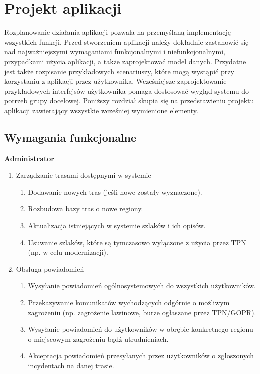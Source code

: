 \section{Projekt aplikacji} 
Rozplanowanie działania aplikacji pozwala na przemyślaną implementację wszystkich funkcji. Przed stworzeniem aplikacji należy dokładnie zastanowić się nad najważniejszymi wymaganiami funkcjonalnymi i niefunkcjonalnymi, przypadkami użycia aplikacji, a także zaprojektować model danych. Przydatne jest także rozpisanie przykładowych scenariuszy, które mogą wystąpić przy korzystaniu z aplikacji przez użytkownika. Wcześniejsze zaprojektowanie przykładowych interfejsów użytkownika pomaga dostosować wygląd systemu do potrzeb grupy docelowej. Poniższy rozdział skupia się na przedstawieniu projektu aplikacji zawierający wszystkie wcześniej wymienione elementy.
    \subsection{Wymagania funkcjonalne}
    \textbf{Administrator}
    \begin{enumerate}
        \item Zarządzanie trasami dostępnymi w systemie
        \begin{enumerate}
            \item Dodawanie nowych tras (jeśli nowe zostały wyznaczone).
            \item Rozbudowa bazy tras o nowe regiony.
            \item Aktualizacja istniejących w systemie szlaków i ich opisów.
            \item Usuwanie szlaków, które są tymczasowo wyłączone z użycia przez TPN (np. w celu modernizacji).
        \end{enumerate}
        \item Obsługa powiadomień
        \begin{enumerate}
            \item Wysyłanie powiadomień ogólnosystemowych do wszystkich użytkowników.
            \item Przekazywanie komunikatów wychodzących odgórnie o możliwym zagrożeniu (np. zagrożenie lawinowe, burze ogłaszane przez TPN/GOPR).
            \item Wysyłanie powiadomień do użytkowników w obrębie konkretnego regionu o miejscowym zagrożeniu bądź utrudnieniach.
            \item Akceptacja powiadomień przesyłanych przez użytkowników o zgłoszonych incydentach na danej trasie.
        \end{enumerate}
    \end{enumerate}
